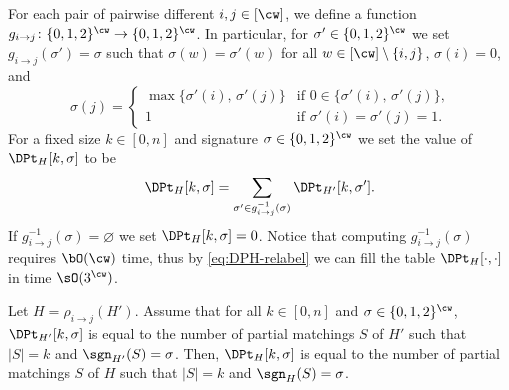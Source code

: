 For each pair of pairwise different $i,j \in [\cw]$,
we define a function $g_{i \to j} \colon \{0,1,2\}^{\cw} \to \{0,1,2\}^{\cw}$.
In particular, for $\sigma' \in \{0,1,2\}^{\cw}$ we set $g_{i \to j}(\sigma') = \sigma$
such that $\sigma(w) = \sigma'(w)$ for all $w \in [\cw] \setminus \{i,j\}$,
$\sigma(i) = 0$, and
\[
    \sigma(j) =
        \begin{cases}
            \max \{ \sigma'(i), \, \sigma'(j) \}    &\text{if $0 \in \{\sigma'(i), \, \sigma'(j)\}$,}\\
            1                                       &\text{if $\sigma'(i) = \sigma'(j) = 1$}.
        \end{cases}
\]
For a fixed size $k \in [0,n]$ and signature $\sigma \in \{0,1,2\}^{\cw}$ we set the value of $\DPt_H[k,\sigma]$ to be
\begin{equation}\label{eq:DPH-relabel}
    \DPt_H[k,\sigma] = \sum_{\sigma' \in g^{-1}_{i \to j} (\sigma)} \DPt_{H'}[k,\sigma'].
\end{equation}
If $g^{-1}_{i \to j}(\sigma) = \varnothing$ we set $\DPt_H[k,\sigma] = 0$.
Notice that computing $g^{-1}_{i \to j}(\sigma)$ requires $\bO(\cw)$ time,
thus by \cref{eq:DPH-relabel} we can fill the table $\DPt_H[\cdot,\cdot]$ in time $\sO(3^{\cw})$.

\begin{lemmarep}[\appsymb]\label{lemma:induced:cw:relabel-correctness}
    Let $H = \rho_{i \to j}(H')$.
    Assume that for all $k \in [0,n]$ and $\sigma \in \{0,1,2\}^{\cw}$,
    $\DPt_{H'}[k,\sigma]$ is equal to the number of partial matchings $S$ of $H'$ such that $|S|=k$ and $\sgn_{H'}(S) = \sigma$.
    Then, $\DPt_H[k,\sigma]$ is equal to the number of partial matchings $S$ of $H$ such that $|S|=k$ and $\sgn_H(S) = \sigma$.
\end{lemmarep}

